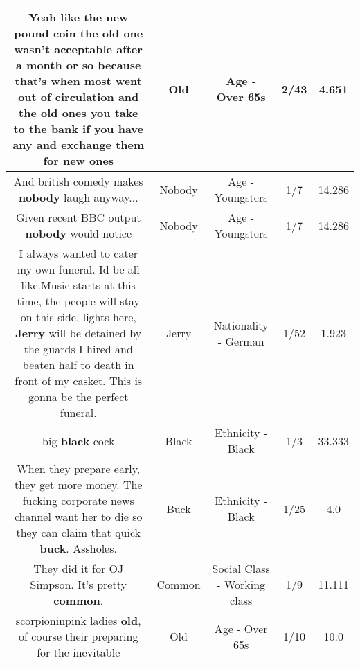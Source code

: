 \documentclass[11pt]{article}
\newlength\mylength
\begin{document}
\begin{center}
\begin{longtable}{|C{.65\mylength}|C{.30\mylength}|C{.12\mylength}|C{.12\mylength}|C{.12\mylength}|}
  \small Yeah like the new pound coin the \textbf{old} one wasn't acceptable after a month or so because that's when most went out of circulation and the \textbf{old} ones you take to the bank if you have any and exchange them for new ones\normalsize   & Old & Age - Over 65s & 2/43 & 4.651 \\  \hline
  \small And british comedy makes \textbf{nobody} laugh anyway...\normalsize   & Nobody & Age - Youngsters & 1/7 & 14.286 \\  \hline
  \small Given recent BBC output \textbf{nobody} would notice\normalsize   & Nobody & Age - Youngsters & 1/7 & 14.286 \\  \hline
  \small I always wanted to cater my own funeral. Id be all like.Music starts at this time, the people will stay on this side, lights here, \textbf{Jerry} will be detained by the guards I hired and beaten half to death in front of my casket. This is gonna be the perfect funeral.\normalsize   & Jerry & Nationality - German & 1/52 & 1.923 \\  \hline
  \small big \textbf{black} cock\normalsize   & Black & Ethnicity - Black & 1/3 & 33.333 \\  \hline
  \small When they prepare early, they get more money. The fucking corporate news channel want her to die so they can claim that quick \textbf{buck}. Assholes.\normalsize   & Buck & Ethnicity - Black & 1/25 & 4.0 \\  \hline
  \small They did it for OJ Simpson. It's pretty \textbf{common}.\normalsize   & Common & Social Class - Working class & 1/9 & 11.111 \\  \hline
  \small scorpioninpink ladies \textbf{old}, of course their preparing for the inevitable\normalsize   & Old & Age - Over 65s & 1/10 & 10.0 \\  \hline

\end{longtable}
\end{center}
\end{document}

